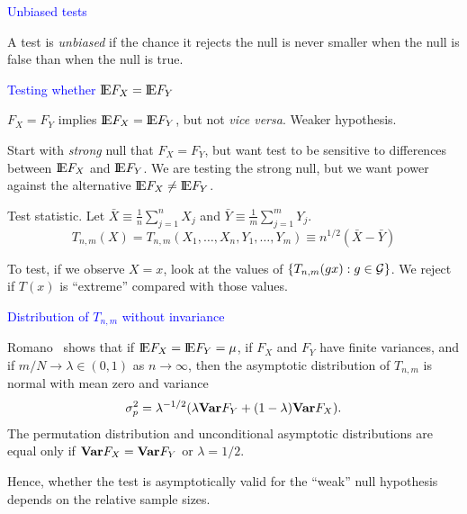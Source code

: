 \documentclass[landscape]{slides}
\newcommand{\EE}{\hbox{I\kern-.1667em\hbox{E}}}
\newcommand{\cG}{{\cal G}}
\newcommand{\beq}{\begin{equation}}
\newcommand{\eeq}{\end{equation}}
\newcommand{\Var}{{\bf Var}}
\begin{document}
\begin{slide}
{\textcolor{blue}{Unbiased tests}}

A test is {\em unbiased\/} if the chance it rejects the null is never smaller
when the null is false than when the null is true.

\end{slide}



\begin{slide}
{\textcolor{blue}{Testing whether $\EE F_X = \EE F_Y$}}

$F_X = F_Y$ implies $\EE F_X = \EE F_Y$, but not {\em vice versa\/}.
Weaker hypothesis.

Start with {\em strong\/} null that $F_X = F_Y$, but want test to be sensitive
to differences between $\EE F_X$ and $\EE F_Y$.
We are testing the strong null, but we want power against
the alternative $\EE F_X \ne \EE F_Y$.

Test statistic.  Let $\bar{X} \equiv \frac{1}{n} \sum_{j=1}^n X_j$ and
$\bar{Y} \equiv  \frac{1}{m} \sum_{j=1}^m Y_j$.
\beq
   T_{n,m}(X) = T_{n,m}(X_1, \ldots, X_n, Y_1, \ldots, Y_m)
      \equiv n^{1/2} ( \bar{X} - \bar{Y} )
\eeq

To test, if we observe $X = x$,
look at the values of $\{ T_{n,m} (gx) : g \in \cG\}$.
We reject if $T(x)$ is ``extreme'' compared with those values.

\end{slide}

\begin{slide}
{\textcolor{blue}{Distribution of $T_{n,m}$ without invariance}}

Romano~\cite{romano90} shows that if $\EE F_X = \EE F_Y = \mu$,
if $F_X$ and $F_Y$ have finite variances, and if $m/N \rightarrow \lambda
\in (0, 1)$ as $n \rightarrow \infty$,
then the asymptotic distribution of $T_{n,m}$ is normal with
mean zero and variance
\beq
    \sigma_p^2 = \lambda^{-1/2} (\lambda \Var F_Y + (1-\lambda) \Var F_X).
\eeq
The permutation distribution and unconditional asymptotic distributions
are equal only if $\Var F_X = \Var F_Y$ or $\lambda = 1/2$.

Hence, whether the test is asymptotically valid for the ``weak'' null hypothesis
depends on the relative sample sizes.

\end{slide}
\end{document}
